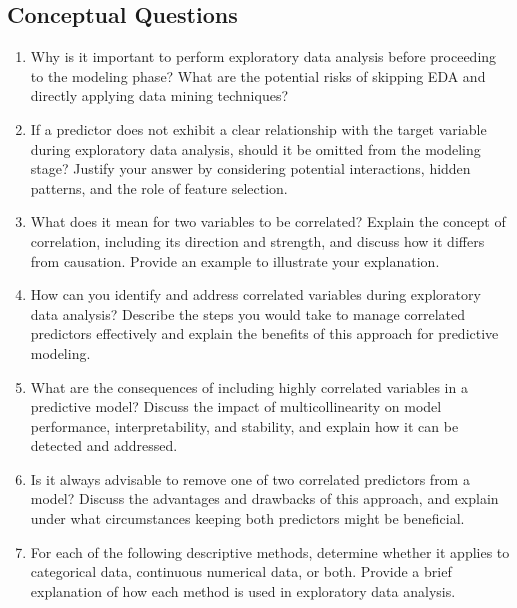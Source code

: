 \documentclass[
  11pt,
]{book}
\theoremstyle{definition}
\theoremstyle{definition}
\theoremstyle{definition}
\theoremstyle{definition}
\theoremstyle{remark}
\begin{document}
\subsection*{Conceptual Questions}\label{conceptual-questions}


\begin{enumerate}
\def\labelenumi{\arabic{enumi}.}
\item
  Why is it important to perform exploratory data analysis before proceeding to the modeling phase? What are the potential risks of skipping EDA and directly applying data mining techniques?
\item
  If a predictor does not exhibit a clear relationship with the target variable during exploratory data analysis, should it be omitted from the modeling stage? Justify your answer by considering potential interactions, hidden patterns, and the role of feature selection.
\item
  What does it mean for two variables to be correlated? Explain the concept of correlation, including its direction and strength, and discuss how it differs from causation. Provide an example to illustrate your explanation.
\item
  How can you identify and address correlated variables during exploratory data analysis? Describe the steps you would take to manage correlated predictors effectively and explain the benefits of this approach for predictive modeling.
\item
  What are the consequences of including highly correlated variables in a predictive model? Discuss the impact of multicollinearity on model performance, interpretability, and stability, and explain how it can be detected and addressed.
\item
  Is it always advisable to remove one of two correlated predictors from a model? Discuss the advantages and drawbacks of this approach, and explain under what circumstances keeping both predictors might be beneficial.
\item
  For each of the following descriptive methods, determine whether it applies to categorical data, continuous numerical data, or both. Provide a brief explanation of how each method is used in exploratory data analysis.


\end{enumerate}
\end{document}
